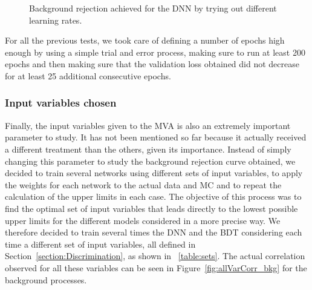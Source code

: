 \documentclass[a4paper, 10pt, openright]{report}
\begin{document}
\begin{appendices}
\begin{figure}[htbp]
{\begin{minipage}[b]{.48\textwidth}
\end{minipage} \hfill
}
\caption{Background rejection achieved for the \ac{DNN} by trying out different learning rates.}
\label{fig:optBatch}
\end{figure}

For all the previous tests, we took care of defining a number of epochs high enough by using a simple trial and error process, making sure to run at least 200 epochs and then making sure that the validation loss obtained did not decrease for at least 25 additional consecutive epochs.  

\subsubsection{Input variables chosen}

Finally, the input variables given to the \ac{MVA} is also an extremely important parameter to study. It has not been mentioned so far because it actually received a different treatment than the others, given its importance. Instead of simply changing this parameter to study the background rejection curve obtained, we decided to train several networks using different sets of input variables, to apply the weights for each network to the actual data and \ac{MC} and to repeat the calculation of the upper limits in each case. The objective of this process was to find the optimal set of input variables that leads directly to the lowest possible upper limits for the different models considered in a more precise way. We therefore decided to train several times the \ac{DNN} and the \ac{BDT} considering each time a different set of input variables, all defined in Section~\ref{section:Discrimination}, as shown in ~\ref{table:sets}. The actual correlation observed for all these variables can be seen in Figure~\ref{fig:allVarCorr_bkg} for the background processes.%


\end{appendices}
\end{document}
